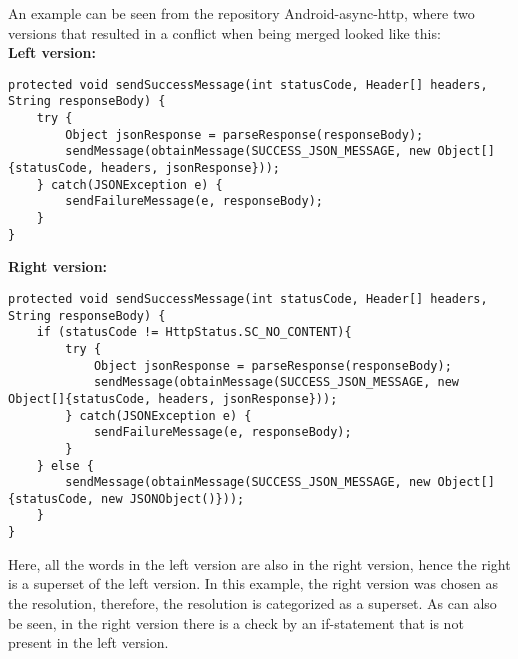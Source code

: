 An example can be seen from the repository Android-async-http, where two versions that resulted in a conflict when being merged looked like this:\\
\textbf{Left version:}
\lstset{language=Java,numbers=left,xleftmargin=2em,frame=single,framexleftmargin=1.5em}
\begin{lstlisting}[frame=single,breaklines=true,tabsize=2]
protected void sendSuccessMessage(int statusCode, Header[] headers, String responseBody) {
	try {
		Object jsonResponse = parseResponse(responseBody);
		sendMessage(obtainMessage(SUCCESS_JSON_MESSAGE, new Object[]{statusCode, headers, jsonResponse}));
	} catch(JSONException e) {
		sendFailureMessage(e, responseBody);
	}
}
\end{lstlisting}
\textbf{Right version:}
\lstset{language=Java,numbers=left,xleftmargin=2em,frame=single,framexleftmargin=1.5em}
\begin{lstlisting}[frame=single,breaklines=true,tabsize=2]
protected void sendSuccessMessage(int statusCode, Header[] headers, String responseBody) {
	if (statusCode != HttpStatus.SC_NO_CONTENT){
		try {
			Object jsonResponse = parseResponse(responseBody);
			sendMessage(obtainMessage(SUCCESS_JSON_MESSAGE, new Object[]{statusCode, headers, jsonResponse}));
		} catch(JSONException e) {
			sendFailureMessage(e, responseBody);
		}
	} else {
		sendMessage(obtainMessage(SUCCESS_JSON_MESSAGE, new Object[]{statusCode, new JSONObject()}));
	}
}
\end{lstlisting}
Here, all the words in the left version are also in the right version, hence the right is a superset of the left version. In this example, the right version was chosen as the resolution, therefore, the resolution is categorized as a superset. As can also be seen, in the right version there is a check by an if-statement that is not present in the left version.
\FloatBarrier
